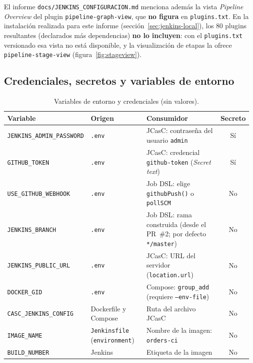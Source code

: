 \documentclass[11pt,a4paper]{article}
\newcommand{\ruta}[1]{\nolinkurl{#1}} %
\begin{document}
El informe \ruta{docs/JENKINS_CONFIGURACION.md} menciona además la vista \emph{Pipeline Overview}
del plugin \texttt{pipeline-graph-view}, que \textbf{no figura} en \texttt{plugins.txt}. En la
instalación realizada para este informe (sección~\ref{sec:jenkins-local}), los 80 plugins resultantes
(declarados más dependencias) \textbf{no lo incluyen}: con el \texttt{plugins.txt} versionado esa
vista no está disponible, y la visualización de etapas la ofrece \texttt{pipeline-stage-view}
(figura~\ref{fig:stageview}).

\subsection{Credenciales, secretos y variables de entorno}

\begin{table}[H]
\centering
\small
\begin{tabularx}{\textwidth}{@{}l L L c@{}}
\toprule
\textbf{Variable} & \textbf{Origen} & \textbf{Consumidor} & \textbf{Secreto}\\
\midrule
\texttt{JENKINS\_ADMIN\_PASSWORD} & \texttt{.env} & JCasC: contraseña del usuario \texttt{admin} & Sí\\
\texttt{GITHUB\_TOKEN} & \texttt{.env} & JCasC: credencial \texttt{github-token} (\emph{Secret text}) & Sí\\
\texttt{USE\_GITHUB\_WEBHOOK} & \texttt{.env} & Job DSL: elige \texttt{githubPush()} o \texttt{pollSCM} & No\\
\texttt{JENKINS\_BRANCH} & \texttt{.env} & Job DSL: rama construida (desde el PR~\#2; por defecto \texttt{*/master}) & No\\
\texttt{JENKINS\_PUBLIC\_URL} & \texttt{.env} & JCasC: URL del servidor (\texttt{location.url}) & No\\
\texttt{DOCKER\_GID} & \texttt{.env} & Compose: \texttt{group\_add} (requiere \texttt{--env-file}) & No\\
\texttt{CASC\_JENKINS\_CONFIG} & Dockerfile y Compose & Ruta del archivo JCasC & No\\
\texttt{IMAGE\_NAME} & \texttt{Jenkinsfile} (\texttt{environment}) & Nombre de la imagen: \texttt{orders-ci} & No\\
\texttt{BUILD\_NUMBER} & Jenkins & Etiqueta de la imagen & No\\
\bottomrule
\end{tabularx}
\caption{Variables de entorno y credenciales (sin valores).}
\label{tab:variables}
\end{table}
\end{document}
